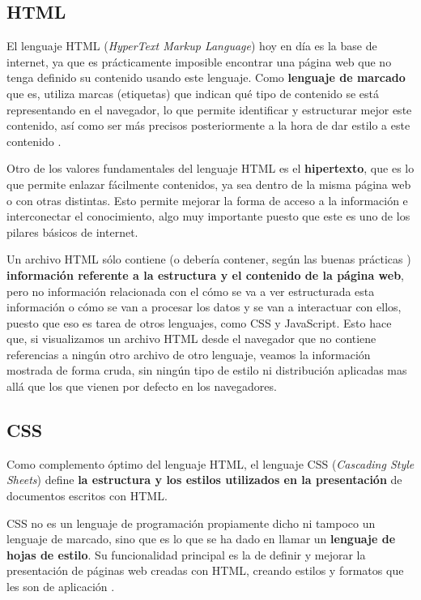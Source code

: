 \subsection{HTML}

El lenguaje HTML (\textit{HyperText Markup Language}) hoy en día es la base de internet, ya que es prácticamente imposible encontrar una página web que no tenga definido su contenido usando este lenguaje. Como \textbf{lenguaje de marcado} que es, utiliza marcas (etiquetas) que indican qué tipo de contenido se está representando en el navegador, lo que permite identificar y estructurar mejor este contenido, así como ser más precisos posteriormente a la hora de dar estilo a este contenido \cite{mdn:html}.

Otro de los valores fundamentales del lenguaje HTML es el \textbf{hipertexto}, que es lo que permite enlazar fácilmente contenidos, ya sea dentro de la misma página web o con otras distintas. Esto permite mejorar la forma de acceso a la información e interconectar el conocimiento, algo muy importante puesto que este es uno de los pilares básicos de internet.

Un archivo HTML sólo contiene (o debería contener, según las buenas prácticas \cite{midudev:html}) \textbf{información referente a la estructura y el contenido de la página web}, pero no información relacionada con el cómo se va a ver estructurada esta información o cómo se van a procesar los datos y se van a interactuar con ellos, puesto que eso es tarea de otros lenguajes, como CSS y JavaScript. Esto hace que, si visualizamos un archivo HTML desde el navegador que no contiene referencias a ningún otro archivo de otro lenguaje, veamos la información mostrada de forma cruda, sin ningún tipo de estilo ni distribución aplicadas mas allá que los que vienen por defecto en los navegadores.

\subsection{CSS}

Como complemento óptimo del lenguaje HTML, el lenguaje CSS (\textit{Cascading Style Sheets}) define \textbf{la estructura y los estilos utilizados en la presentación} de documentos escritos con HTML.

CSS no es un lenguaje de programación propiamente dicho ni tampoco un lenguaje de marcado, sino que es lo que se ha dado en llamar un \textbf{lenguaje de hojas de estilo}. Su funcionalidad principal es la de definir y mejorar la presentación de páginas web creadas con HTML, creando estilos y formatos que les son de aplicación \cite{mdn:css}.

